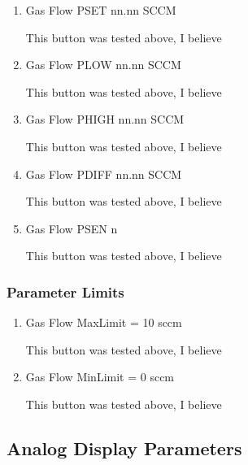 \documentclass[11pt]{book}		%
\begin{document}
\begin{enumerate}
 \item Gas Flow PSET   nn.nn SCCM

\color{red}
This button was tested above, I believe
\color{black}

 \item Gas Flow PLOW   nn.nn SCCM

\color{red}
This button was tested above, I believe
\color{black}

 \item Gas Flow PHIGH  nn.nn SCCM

\color{red}
This button was tested above, I believe
\color{black}

 \item Gas Flow PDIFF  nn.nn SCCM

\color{red}
This button was tested above, I believe
\color{black}

 \item Gas Flow PSEN   n

\color{red}
This button was tested above, I believe
\color{black}

\end{enumerate}

\subsubsection{Parameter Limits}

\begin{enumerate}
 \item Gas Flow MaxLimit = 10 sccm

\color{red}
This button was tested above, I believe
\color{black}

 \item Gas Flow MinLimit = 0 sccm

\color{red}
This button was tested above, I believe
\color{black}

\end{enumerate}

\subsection{Analog Display Parameters}
\end{document}
